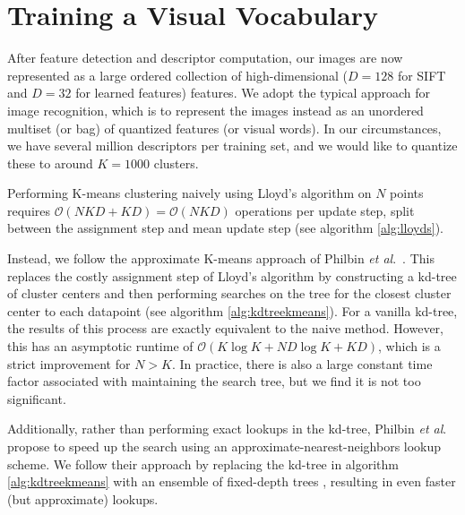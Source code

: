 %

\section{Training a Visual Vocabulary}

After feature detection and descriptor computation, our images are now represented as a large ordered collection of high-dimensional ($D=128$ for SIFT and $D=32$ for learned features) features. We adopt the typical approach for image recognition, which is to represent the images instead as an unordered multiset (or bag) of quantized features (or visual words). In our circumstances, we have several million descriptors per training set, and we would like to quantize these to around $K=1000$ clusters.

Performing K-means clustering naively using Lloyd's algorithm \cite{lloyd1982least} on $N$ points requires $\mathcal{O}(N K D + K D) = \mathcal{O}(N K D)$ operations per update step, split between the assignment step and mean update step (see algorithm \ref{alg:lloyds}).

Instead, we follow the approximate K-means approach of Philbin \textit{et al}.\ \cite{philbin2007object}. This replaces the costly assignment step of Lloyd's algorithm by constructing a kd-tree of cluster centers and then performing searches on the tree for the closest cluster center to each datapoint (see algorithm \ref{alg:kdtreekmeans}). For a vanilla kd-tree, the results of this process are exactly equivalent to the naive method. However, this has an asymptotic runtime of $\mathcal{O}(K \log K + N D \log K + K D)$, which is a strict improvement for $N > K$. In practice, there is also a large constant time factor associated with maintaining the search tree, but we find it is not too significant.

Additionally, rather than performing exact lookups in the kd-tree, Philbin \textit{et al}. propose to speed up the search using an approximate-nearest-neighbors lookup scheme. We follow their approach by replacing the kd-tree in algorithm \ref{alg:kdtreekmeans} with an ensemble of fixed-depth trees \cite{muja2013flann}, resulting in even faster (but approximate) lookups.

